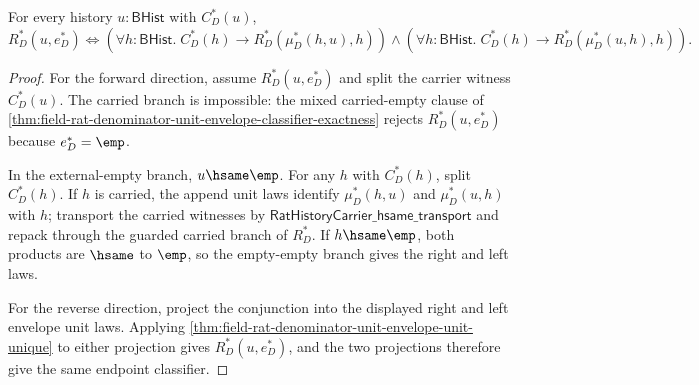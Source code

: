 \begin{theorem}
\label{thm:field-rat-denominator-unit-envelope-unit-iff}
For every history $u:\mathsf{BHist}$ with $C_D^\ast(u)$,
$$
R_D^\ast(u,e_D^\ast)\Longleftrightarrow
\left(\forall h:\mathsf{BHist}.\;
C_D^\ast(h)\to R_D^\ast(\mu_D^\ast(h,u),h)\right)
\land
\left(\forall h:\mathsf{BHist}.\;
C_D^\ast(h)\to R_D^\ast(\mu_D^\ast(u,h),h)\right).
$$
\end{theorem}
\begin{proof}
For the forward direction, assume $R_D^\ast(u,e_D^\ast)$ and split the carrier
witness $C_D^\ast(u)$. The carried branch is impossible: the mixed
carried-empty clause of
\autoref{thm:field-rat-denominator-unit-envelope-classifier-exactness} rejects
$R_D^\ast(u,e_D^\ast)$ because $e_D^\ast=\emp$.

In the external-empty branch, $u\hsame\emp$. For any $h$ with $C_D^\ast(h)$,
split $C_D^\ast(h)$. If $h$ is carried, the append unit laws identify
$\mu_D^\ast(h,u)$ and $\mu_D^\ast(u,h)$ with $h$; transport the carried
witnesses by $\mathsf{RatHistoryCarrier\_hsame\_transport}$ and repack through
the guarded carried branch of $R_D^\ast$. If $h\hsame\emp$, both products are
$\hsame$ to $\emp$, so the empty-empty branch gives the right and left laws.

For the reverse direction, project the conjunction into the displayed right and
left envelope unit laws. Applying
\autoref{thm:field-rat-denominator-unit-envelope-unit-unique} to either
projection gives $R_D^\ast(u,e_D^\ast)$, and the two projections therefore give
the same endpoint classifier.
\end{proof}
